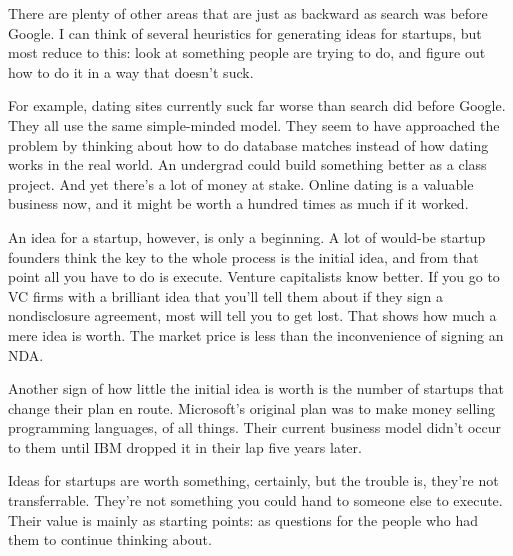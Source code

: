 There are plenty of
                    other areas that are just as backward as search was before
                    Google. I can think of several heuristics for generating
                    ideas for startups, but most reduce to this: look at
                    something people are trying to do, and figure out how to do
                    it in a way that doesn't suck.

For example,
                    dating sites currently suck far worse than search did before
                    Google. They all use the same simple-minded model. They seem
                    to have approached the problem by thinking about how to do
                    database matches instead of how dating works in the real
                    world. An undergrad could build something better as a class
                    project. And yet there's a lot of money at stake. Online
                    dating is a valuable business now, and it might be worth a
                    hundred times as much if it worked.

An idea for a
                    startup, however, is only a beginning. A lot of would-be
                    startup founders think the key to the whole process is the
                    initial idea, and from that point all you have to do is
                    execute. Venture capitalists know better. If you go to VC
                    firms with a brilliant idea that you'll tell them about if
                    they sign a nondisclosure agreement, most will tell you to
                    get lost. That shows how much a mere idea is worth. The
                    market price is less than the inconvenience of signing an
                    NDA.

Another sign of how little the initial idea
                    is worth is the number of startups that change their plan en
                    route. Microsoft's original plan was to make money selling
                    programming languages, of all things. Their current business
                    model didn't occur to them until IBM dropped it in their lap
                    five years later.

Ideas for startups are worth
                    something, certainly, but the trouble is, they're not
                    transferrable. They're not something you could hand to
                    someone else to execute. Their value is mainly as starting
                    points: as questions for the people who had them to continue
                    thinking about.

